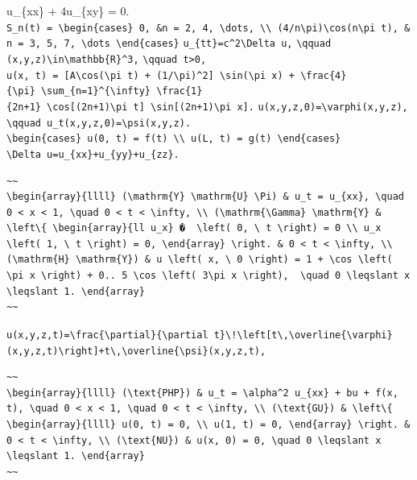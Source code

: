 \documentclass[
  ukrainian,
]{article}
\begin{document}
u\_\{xx\} + 4u\_\{xy\} = 0.
\texttt{S\_n(t)\ =\ \textbackslash{}begin\{cases\}\ 0,\ \&n\ =\ 2,\ 4,\ \textbackslash{}dots,\ \textbackslash{}\textbackslash{}\ (4/n\textbackslash{}pi)\textbackslash{}cos(n\textbackslash{}pi\ t),\ \&n\ =\ 3,\ 5,\ 7,\ \textbackslash{}dots\ \textbackslash{}end\{cases\}}
\texttt{u\_\{tt\}=c\^{}2\textbackslash{}Delta\ u,}
\texttt{\textbackslash{}qquad}
\texttt{(x,y,z)\textbackslash{}in\textbackslash{}mathbb\{R\}\^{}3,}
\texttt{\textbackslash{}qquad\ t\textgreater{}0,}
\texttt{u(x,\ t)\ =\ {[}A\textbackslash{}cos(\textbackslash{}pi\ t)\ +\ (1/\textbackslash{}pi)\^{}2{]}\ \textbackslash{}sin(\textbackslash{}pi\ x)\ +\ \textbackslash{}frac\{4\}\{\textbackslash{}pi\}\ \textbackslash{}sum\_\{n=1\}\^{}\{\textbackslash{}infty\}\ \textbackslash{}frac\{1\}\{2n+1\}\ \textbackslash{}cos{[}(2n+1)\textbackslash{}pi\ t{]}\ \textbackslash{}sin{[}(2n+1)\textbackslash{}pi\ x{]}.}
\texttt{u(x,y,z,0)=\textbackslash{}varphi(x,y,z),}
\texttt{\textbackslash{}qquad\ u\_t(x,y,z,0)=\textbackslash{}psi(x,y,z).}
\texttt{\textbackslash{}begin\{cases\}\ u(0,\ t)\ =\ f(t)\ \textbackslash{}\textbackslash{}\ u(L,\ t)\ =\ g(t)\ \textbackslash{}end\{cases\}}
\texttt{\textbackslash{}Delta\ u=u\_\{xx\}+u\_\{yy\}+u\_\{zz\}.}

\begin{verbatim}
~~
\begin{array}{llll} (\mathrm{Y} \mathrm{U} \Pi) & u_t = u_{xx}, \quad 0 < x < 1, \quad 0 < t < \infty, \\ (\mathrm{\Gamma} \mathrm{Y} & \left\{ \begin{array}{ll u_x} �  \left( 0, \ t \right) = 0 \\ u_x \left( 1, \ t \right) = 0, \end{array} \right. & 0 < t < \infty, \\ (\mathrm{H} \mathrm{Y}) & u \left( x, \ 0 \right) = 1 + \cos \left( \pi x \right) + 0.. 5 \cos \left( 3\pi x \right),  \quad 0 \leqslant x \leqslant 1. \end{array}
~~
\end{verbatim}

\texttt{u(x,y,z,t)=\textbackslash{}frac\{\textbackslash{}partial\}\{\textbackslash{}partial\ t\}\textbackslash{}!\textbackslash{}left{[}t\textbackslash{},\textbackslash{}overline\{\textbackslash{}varphi\}(x,y,z,t)\textbackslash{}right{]}+t\textbackslash{},\textbackslash{}overline\{\textbackslash{}psi\}(x,y,z,t),}

\begin{verbatim}
~~
\begin{array}{llll} (\text{PHP}) & u_t = \alpha^2 u_{xx} + bu + f(x, t), \quad 0 < x < 1, \quad 0 < t < \infty, \\ (\text{GU}) & \left\{ \begin{array}{llll} u(0, t) = 0, \\ u(1, t) = 0, \end{array} \right. & 0 < t < \infty, \\ (\text{NU}) & u(x, 0) = 0, \quad 0 \leqslant x \leqslant 1. \end{array}
~~
\end{verbatim}
\end{document}
